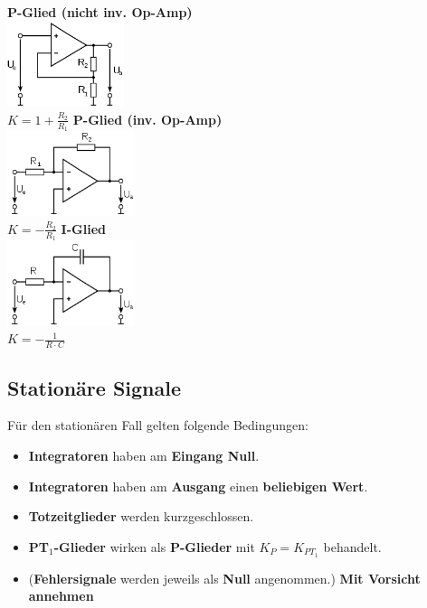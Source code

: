     \begin{multicols}{3}
    \textbf{P-Glied (nicht inv. Op-Amp)} \\
    \includegraphics[height=2.5cm]{./bilder/OP-Amp.png} \\
    $K = 1 + \frac{R_2}{R_1}$ 
    \columnbreak
	\textbf{P-Glied (inv. Op-Amp)} \\ 
	\includegraphics[height=2.5cm]{./bilder/OP-InvAmp.png} \\
	$K=-\frac{R_2}{R_1}$
    \columnbreak     
    \textbf{I-Glied} \\ 
    \includegraphics[height=2.5cm]{./bilder/OP-Integrator.png}\\
    $K = - \frac{1}{R \cdot C}$
    \end{multicols}  
    \begin{minipage}{16cm}
    \subsection{Stationäre Signale}
	Für den stationären Fall gelten folgende Bedingungen:
	\begin{itemize}
    	\item \textbf{Integratoren} haben am \textbf{Eingang Null}.
    	\item \textbf{Integratoren} haben am \textbf{Ausgang} einen \textbf{beliebigen Wert}.
    	\item \textbf{Totzeitglieder} werden kurzgeschlossen.
    	\item \textbf{PT$_1$-Glieder} wirken als \textbf{P-Glieder} mit $K_P = K_{PT_1}$ behandelt.
    	\item (\textbf{Fehlersignale} werden jeweils als \textbf{Null} angenommen.) \textbf{Mit Vorsicht annehmen}
  	\end{itemize}
  	\end{minipage} \\
